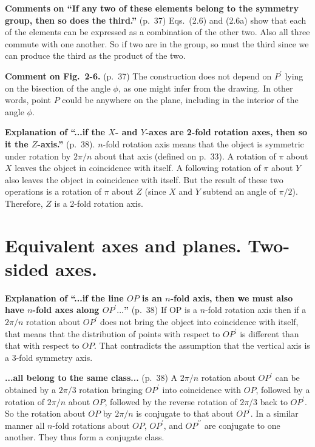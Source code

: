 {\bf Comments on ``If any two of these elements belong to the symmetry
  group, then so does the third.''} (p.\ 37) Eqs.\ (2.6) and (2.6a)
show that each of the elements can be expressed as a combination of
the other two. Also all three commute with one another. So if two are
in the group, so must the third since we can produce the third as the
product of the two.

{\bf Comment on Fig.\ 2-6.} (p.\ 37) The construction does not depend
on $P^\prime$ lying on the bisection of the angle $\phi$, as one might
infer from the drawing. In other words, point $P$ could be anywhere on
the plane, including in the interior of the angle $\phi$.

{\bf Explanation of ``...if the $X$- and $Y$-axes are 2-fold rotation
  axes, then so it the $Z$-axis.''} (p.\ 38). $n$-fold rotation axis
means that the object is symmetric under rotation by $2\pi/n$ about
that axis (defined on p.\ 33).  A rotation of $\pi$ about $X$ leaves
the object in coincidence with itself. A following rotation of $\pi$
about $Y$ also leaves the object in coincidence with itself. But the
result of these two operations is a rotation of $\pi$ about $Z$ (since
$X$ and $Y$ subtend an angle of $\pi/2$). Therefore, $Z$ is a 2-fold
rotation axis.

\section{Equivalent axes and planes. Two-sided axes.}

{\bf Explanation of ``...if the line $OP$ is an $n$-fold axis, then we
  must also have $n$-fold axes along $OP^\prime...$''} (p.\ 38) If OP
is a $n$-fold rotation axis then if a $2\pi/n$ rotation about $OP^\prime$
does not bring the object into coincidence with itself, that means
that the distribution of points with respect to $OP^\prime$ is
different than that with respect to $OP$. That contradicts the
assumption that the vertical axis is a 3-fold symmetry axis.

{\bf ...all belong to the same class...} (p.\ 38) A $2\pi/n$ rotation about
$OP^\prime$ can be obtained by a $2\pi/3$ rotation bringing $OP^\prime$ into
coincidence with $OP$, followed by a rotation of $2\pi/n$ about $OP$,
followed by the reverse rotation of $2\pi/3$ back to $OP^\prime$. So the
rotation about $OP$ by $2\pi/n$ is conjugate to that about $OP^\prime$. In a
similar manner all $n$-fold rotations about $OP$, $OP^\prime$, and
$OP^{\prime\prime}$ are conjugate to one another. They thus form a
conjugate class.

